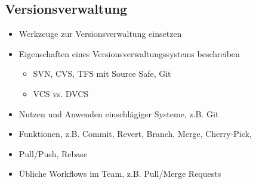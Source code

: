\clearpage

\subsection{Versionsverwaltung}
\label{sec:Versionsverwaltung} 



\begin{itemize}
	\item Werkzeuge zur Versionsverwaltung einsetzen
	\item Eigenschaften eines Versionsverwaltungssystems beschreiben
	\begin{itemize}
		\item SVN, CVS, TFS mit Source Safe, Git
		\item VCS vs. DVCS
	\end{itemize}
	\item Nutzen und Anwenden einschlägiger Systeme, z.B. Git
	\item Funktionen, z.B. Commit, Revert, Branch, Merge, Cherry-Pick, \item Pull/Push, Rebase
	\item Übliche Workflows im Team, z.B. Pull/Merge Requests
\end{itemize}

